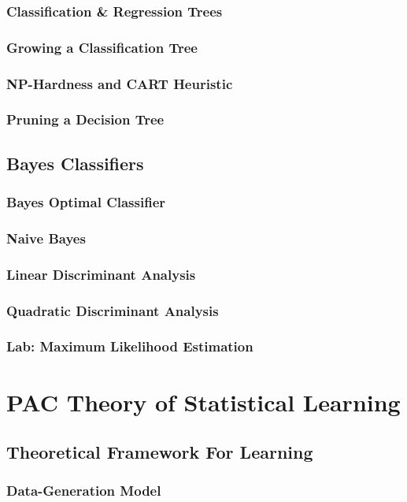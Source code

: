 \documentclass[11pt,fleqn]{book} %
\begin{document}
        \subsection{Classification \& Regression Trees}
        \subsection{Growing a Classification Tree}
        \subsection{NP-Hardness and CART Heuristic}
        \subsection{Pruning a Decision Tree}
    
    \section{Bayes Classifiers}
        \subsection{Bayes Optimal Classifier}
        \subsection{Naive Bayes}
        \subsection{Linear Discriminant Analysis}
        \subsection{Quadratic Discriminant Analysis}
        \subsection{Lab: Maximum Likelihood Estimation}
        
\chapter{PAC Theory of Statistical Learning}
    \section{Theoretical Framework For Learning}
        \subsection{Data-Generation Model}
\end{document}
